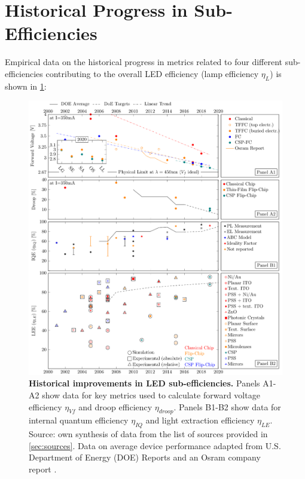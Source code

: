 \documentclass[parskip=full]{article}
\begin{document}
\clearpage
\section{Historical Progress in Sub-Efficiencies}

Empirical data on the historical progress in metrics related to four different sub-efficiencies contributing to the overall LED efficiency (lamp efficiency $\eta_L$) is shown in \cref{fgr:subeff}:

\begin{figure}[H]
\centering
\includegraphics[width=15.5cm]{./figures/subefficiencies_progress.pdf}
\caption{\textbf{Historical improvements in LED sub-efficiencies.} Panels A1-A2 show data for key metrics used to calculate forward voltage efficiency $\eta_{Vf}$ and droop efficiency $\eta_{droop}$. Panels B1-B2 show data for internal quantum efficiency $\eta_{IQ}$ and light extraction efficiency $\eta_{LE}$. Source: own synthesis of data from the list of sources provided in \cref{sec:sources}. Data on average device performance adapted from U.S. Department of Energy (DOE) Reports \cite{doe_ssl_multiyear_2007}\cite{doe_ssl_multiyear_2008}\cite{doe_ssl_multiyear_2013}\cite{doe_ssl_rnd_2016}\cite{doe_ssl_rnd_2018} and an Osram company report \cite{beale_leds_2015}.}
\label{fgr:subeff}
\vspace{-20mm}
\end{figure}
\end{document}
